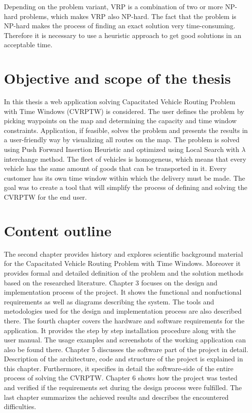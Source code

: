 \documentclass[a4paper,twoside,12pt]{book}
\begin{document}
Depending on the problem variant, VRP is a combination of two or more NP-hard problems, which makes VRP also NP-hard. The fact that the problem is NP-hard makes the process of finding an exact solution very time-consuming. Therefore it is necessary to use a heuristic approach to get good solutions in an acceptable time.
\section{Objective and scope of the thesis}
In this thesis a web application solving Capacitated Vehicle Routing Problem with Time Windows (CVRPTW) is considered. The user defines the problem by picking waypoints on the map and determining the capacity and time window constraints. Application, if feasible, solves the problem and presents the results in a user-friendly way by visualizing all routes on the map.
The problem is solved using Push Forward Insertion Heuristic and optimized using Local Search with {$\lambda$} interchange method. 
The fleet of vehicles is homogeneus, which means that every vehicle has the same amount of goods that can be transported in it. Every customer has its own time window within which the delivery must be made.
The goal was to create a tool that will simplify the process of defining and solving the CVRPTW for the end user.


\section{Content outline}
 The second chapter provides history and explores scientific background material for the Capacitated Vehicle Routing Problem with Time Windows. Moreover it provides formal and detailed definition of the problem and the solution methods based on the researched literature. Chapter 3 focuses on the design and implementation process of the project. It shows the functional and nonfuctional requirements as well as diagrams describing the system. The tools and metodologies used for the design and implementation process are also described there. The fourth chapter covers the hardware and software requirements for the application. It provides the step by step installation procedure along with the user manual. The usage examples and screenshots of the working application can also be found there. Chapter 5 discusses the software part of the project in detail. Description of the architecture, code and structure of the project is explained in this chapter. Furthermore, it specifies in detail the software-side of the entire process of solving the CVRPTW. Chapter 6 shows how the project was tested and verified if the requirements set during the design process were fulfilled. The last chapter summarizes the achieved results and describes the encountered difficulties.
\end{document}
